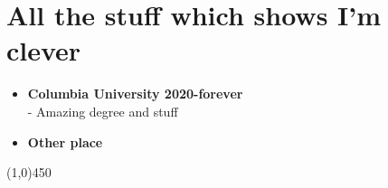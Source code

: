 \section*{All the stuff which shows I'm clever}

\begin{itemize}
  \item \textbf{\large{Columbia University} \hfill \small{2020-forever}}\\
  - Amazing degree and stuff
  \item \textbf{\large{Other place}}\\
\end{itemize}

\line(1,0){450}

